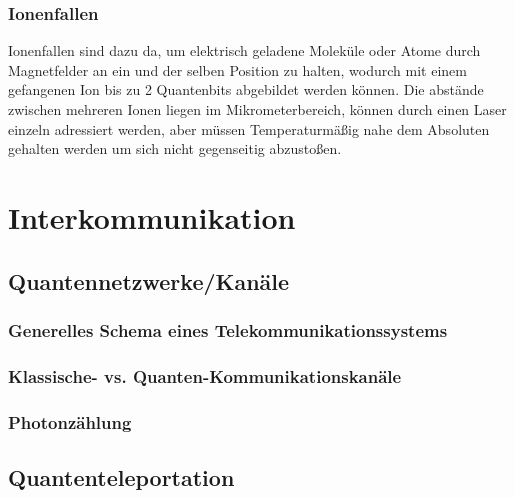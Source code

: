 \subsubsection{Ionenfallen}

Ionenfallen sind dazu da, um elektrisch geladene Moleküle oder Atome durch Magnetfelder an ein und der selben Position zu halten, wodurch mit einem gefangenen Ion bis zu 2 Quantenbits abgebildet werden können. Die abstände zwischen mehreren Ionen liegen im Mikrometerbereich, können durch einen Laser einzeln adressiert werden, aber müssen Temperaturmäßig nahe dem Absoluten gehalten werden um sich nicht gegenseitig abzustoßen.

\section{Interkommunikation}
\label{sec:Interkommunikation}


\subsection{Quantennetzwerke/Kan\"ale}
\label{sec:Quantennetzwerke/Kanale}

\subsubsection{Generelles Schema eines Telekommunikationssystems}

\subsubsection{Klassische- vs. Quanten-Kommunikationskan\"ale}

\subsubsection{Photonz\"ahlung}


\subsection{Quantenteleportation}
\label{sec:Quantenteleportation}






